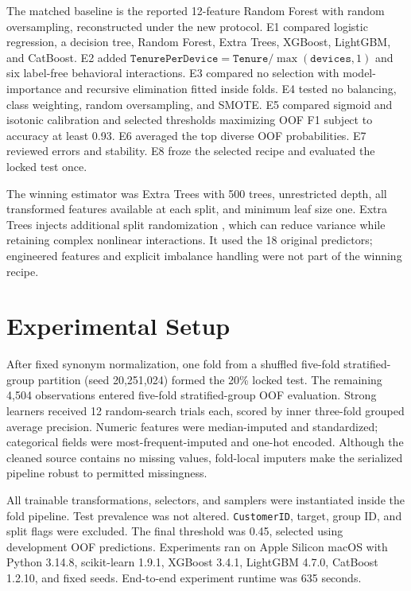 \documentclass[11pt]{article}
\begin{document}
The matched baseline is the reported 12-feature Random Forest with random oversampling, reconstructed under the new protocol. E1 compared logistic regression, a decision tree, Random Forest, Extra Trees, XGBoost, LightGBM, and CatBoost. E2 added $\mathtt{TenurePerDevice}=\mathtt{Tenure}/\max(\mathtt{devices},1)$ and six label-free behavioral interactions. E3 compared no selection with model-importance and recursive elimination fitted inside folds. E4 tested no balancing, class weighting, random oversampling, and SMOTE. E5 compared sigmoid and isotonic calibration and selected thresholds maximizing OOF F1 subject to accuracy at least 0.93. E6 averaged the top diverse OOF probabilities. E7 reviewed errors and stability. E8 froze the selected recipe and evaluated the locked test once.

The winning estimator was Extra Trees with 500 trees, unrestricted depth, all transformed features available at each split, and minimum leaf size one. Extra Trees injects additional split randomization \cite{geurts2006extra}, which can reduce variance while retaining complex nonlinear interactions. It used the 18 original predictors; engineered features and explicit imbalance handling were not part of the winning recipe.

\section{Experimental Setup}
After fixed synonym normalization, one fold from a shuffled five-fold stratified-group partition (seed 20,251,024) formed the 20\% locked test. The remaining 4,504 observations entered five-fold stratified-group OOF evaluation. Strong learners received 12 random-search trials each, scored by inner three-fold grouped average precision. Numeric features were median-imputed and standardized; categorical fields were most-frequent-imputed and one-hot encoded. Although the cleaned source contains no missing values, fold-local imputers make the serialized pipeline robust to permitted missingness.

All trainable transformations, selectors, and samplers were instantiated inside the fold pipeline. Test prevalence was not altered. \texttt{CustomerID}, target, group ID, and split flags were excluded. The final threshold was 0.45, selected using development OOF predictions. Experiments ran on Apple Silicon macOS with Python 3.14.8, scikit-learn 1.9.1, XGBoost 3.4.1, LightGBM 4.7.0, CatBoost 1.2.10, and fixed seeds. End-to-end experiment runtime was 635 seconds.
\end{document}
